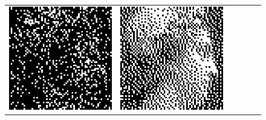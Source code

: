 \begin{figure}
\begin{tabular}{c c c c c c}
		\includegraphics[width=\tilewidth,interpolate=false]{media/chp2/associative_memory/binam/07_01_noise_scaled_crushed.png}&%
		\includegraphics[width=\tilewidth,interpolate=false]{media/chp2/associative_memory/binam/07_02_out_scaled_crushed.png}\\

\end{tabular}
\end{figure}
